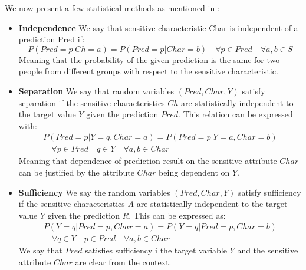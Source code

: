 We now present a few statistical methods as mentioned in \cite{fairness_ml_book_2017}:
\begin{itemize}


    \item \textbf{Independence}
        We say that sensitive characteristic Char is independent of a prediction Pred if:
        \begin{equation}
            P\left(Pred = p|Ch = a\right)=P\left(Pred=p|Char=b\right) \quad \forall p\in Pred \quad \forall a,b \in S
        \end{equation}
        Meaning that the probability of the given prediction is the same for two people from different groups with respect to the sensitive characteristic.
    
    
    \item \textbf{Separation}
        We say that random variables $(Pred,Char,Y)$ satisfy separation if the sensitive characteristics $Ch$ are statistically independent to the target value $Y$ given the prediction $Pred$.
        This relation can be expressed with:
        \begin{equation}
        \begin{split}
            P\left(Pred=p|Y=q,Char=a\right)=P\left(Pred=p|Y=a,Char=b\right) \\
            \quad \forall p\in Pred\quad q \in Y \quad \forall a,b \in Char
        \end{split}
        \end{equation}
        Meaning that dependence of prediction result on the sensitive attribute $Char$ can be justified by the attribute $Char$ being dependent on $Y$.
        
    
    \item \textbf{Sufficiency}
        We say the random variables $(Pred,Char,Y)$ satisfy sufficiency if the sensitive characteristics $A$ are statistically independent to the target value $Y$ given the prediction $R$. This can be expressed as:
        \begin{equation}
        \begin{split}
            P\left(Y=q|Pred=p,Char=a\right)=P\left(Y=q|Pred=p,Char=b\right) \\
            \quad \forall q\in Y\quad p \in Pred \quad \forall a,b \in Char
        \end{split}
        \end{equation}
        We say that $Pred$ satisfies sufficiency i the target variable $Y$ and the sensitive attribute $Char$ are clear from the context.
    
\end{itemize}


